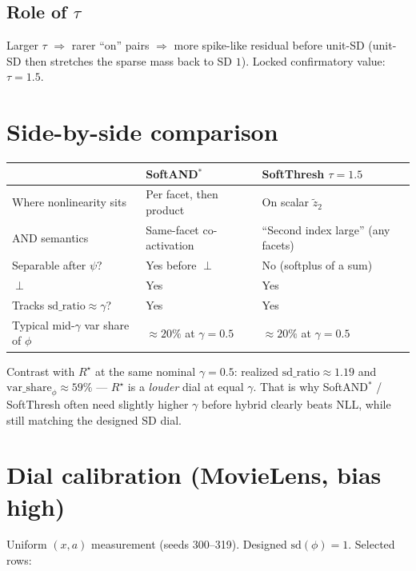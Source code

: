\documentclass[11pt,a4paper]{article}
\begin{document}
\subsection{Role of $\tau$}
Larger $\tau$ $\Rightarrow$ rarer ``on'' pairs $\Rightarrow$ more spike-like residual
before unit-SD (unit-SD then stretches the sparse mass back to SD $1$).
Locked confirmatory value: $\tau=1.5$.

\section{Side-by-side comparison}

\begin{center}
\begin{tabular}{@{}llp{}@{}}
\toprule
 & SoftAND$^*$ & SoftThresh $\tau{=}1.5$ \\
\midrule
Where nonlinearity sits
  & Per facet, then product
  & On scalar $\tilde z_2$ \\
AND semantics
  & Same-facet co-activation
  & ``Second index large'' (any facets) \\
Separable after $\psi$?
  & Yes before $\perp$
  & No (softplus of a sum) \\
$\perp$
  & Yes
  & Yes \\
Tracks $\mathrm{sd\_ratio}\approx\gamma$?
  & Yes
  & Yes \\
Typical mid-$\gamma$ var share of $\phi$
  & $\approx 20\%$ at $\gamma{=}0.5$
  & $\approx 20\%$ at $\gamma{=}0.5$ \\
\bottomrule
\end{tabular}
\end{center}

\noindent
Contrast with $R^\star$ at the same nominal $\gamma{=}0.5$: realized
$\mathrm{sd\_ratio}\approx 1.19$ and $\mathrm{var\_share}_\phi\approx 59\%$ ---
$R^\star$ is a \emph{louder} dial at equal $\gamma$. That is why SoftAND$^*$ /
SoftThresh often need slightly higher $\gamma$ before hybrid clearly beats NLL,
while still matching the designed SD dial.

\section{Dial calibration (MovieLens, bias high)}

Uniform $(x,a)$ measurement (seeds 300--319). Designed $\mathrm{sd}(\phi)=1$.
Selected rows:
\end{document}
